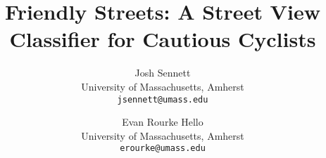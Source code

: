 \documentclass[10pt,twocolumn,letterpaper]{article}
\begin{document}
\title{Friendly Streets: A Street View Classifier for Cautious Cyclists}

\author{Josh Sennett\\
University of Massachusetts, Amherst\\
{\tt\small jsennett@umass.edu}
\and
Evan Rourke Hello\\
University of Massachusetts, Amherst\\
{\tt\small erourke@umass.edu}
}
\end{document}
